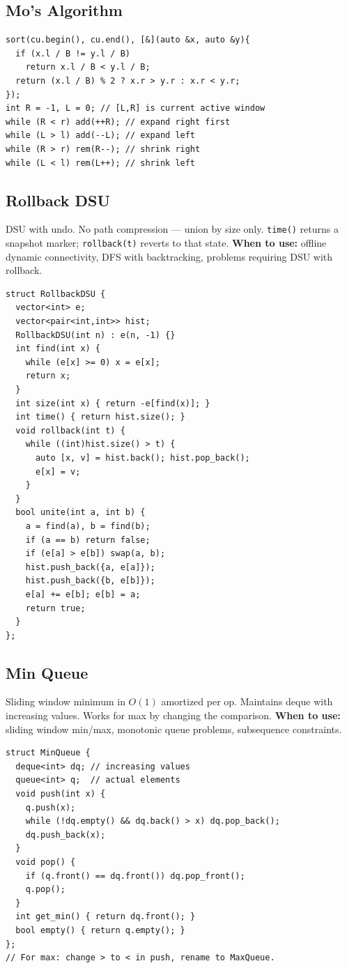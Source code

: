 \subsection{Mo's Algorithm}
\begin{verbatim}
sort(cu.begin(), cu.end(), [&](auto &x, auto &y){
  if (x.l / B != y.l / B)
    return x.l / B < y.l / B;
  return (x.l / B) % 2 ? x.r > y.r : x.r < y.r;
});
int R = -1, L = 0; // [L,R] is current active window
while (R < r) add(++R); // expand right first
while (L > l) add(--L); // expand left
while (R > r) rem(R--); // shrink right
while (L < l) rem(L++); // shrink left
\end{verbatim}
\subsection{Rollback DSU}
DSU with undo. No path compression --- union by size only. \texttt{time()} returns a snapshot marker; \texttt{rollback(t)} reverts to that state.
\textbf{When to use:} offline dynamic connectivity, DFS with backtracking, problems requiring DSU with rollback.
\begin{verbatim}
struct RollbackDSU {
  vector<int> e;
  vector<pair<int,int>> hist;
  RollbackDSU(int n) : e(n, -1) {}
  int find(int x) {
    while (e[x] >= 0) x = e[x];
    return x;
  }
  int size(int x) { return -e[find(x)]; }
  int time() { return hist.size(); }
  void rollback(int t) {
    while ((int)hist.size() > t) {
      auto [x, v] = hist.back(); hist.pop_back();
      e[x] = v;
    }
  }
  bool unite(int a, int b) {
    a = find(a), b = find(b);
    if (a == b) return false;
    if (e[a] > e[b]) swap(a, b);
    hist.push_back({a, e[a]});
    hist.push_back({b, e[b]});
    e[a] += e[b]; e[b] = a;
    return true;
  }
};
\end{verbatim}
\subsection{Min Queue}
Sliding window minimum in $O(1)$ amortized per op. Maintains deque with increasing values.
Works for max by changing the comparison.
\textbf{When to use:} sliding window min/max, monotonic queue problems, subsequence constraints.
\begin{verbatim}
struct MinQueue {
  deque<int> dq; // increasing values
  queue<int> q;  // actual elements
  void push(int x) {
    q.push(x);
    while (!dq.empty() && dq.back() > x) dq.pop_back();
    dq.push_back(x);
  }
  void pop() {
    if (q.front() == dq.front()) dq.pop_front();
    q.pop();
  }
  int get_min() { return dq.front(); }
  bool empty() { return q.empty(); }
};
// For max: change > to < in push, rename to MaxQueue.
\end{verbatim}
